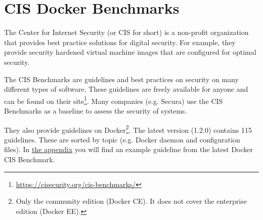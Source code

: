 \section{CIS Docker Benchmarks}
The Center for Internet Security (or CIS for short) is a non-profit organization that provides best practice solutions for digital security. For example, they provide security hardened virtual machine images that are configured for optimal security.

\medskip

The CIS Benchmarks are guidelines and best practices on security on many different types of software. These guidelines are freely available for anyone and can be found on their site\footnote{\url{https://cisecurity.org/cis-benchmarks/}}. Many companies (e.g. Secura) use the CIS Benchmarks as a baseline to assess the security of systems.

\medskip

They also provide guidelines on Docker\footnote{Only the community edition (Docker CE). It does not cover the enterprise edition (Docker EE).}. The latest version (1.2.0) contains 115 guidelines. These are sorted by topic (e.g. Docker daemon and configuration files). In \hyperref[appendix:CIS-Benchmark-Example]{the appendix} you will find an example guideline from the latest Docker CIS Benchmark.
